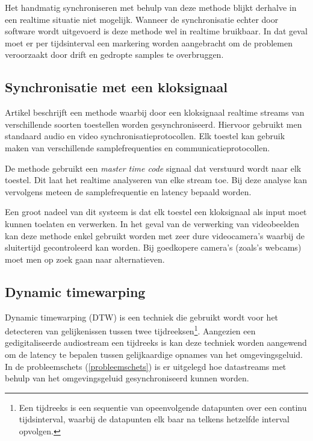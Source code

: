 Het handmatig synchroniseren met behulp van deze methode blijkt derhalve in een realtime situatie niet mogelijk.  Wanneer de synchronisatie echter door software wordt uitgevoerd is deze methode wel in realtime bruikbaar. In dat geval moet er per tijdsinterval een markering worden aangebracht om de problemen veroorzaakt door drift en gedropte samples te overbruggen.

\subsection{Synchronisatie met een kloksignaal}

Artikel \cite{jaimovich2010synchronization} beschrijft een methode waarbij door een kloksignaal realtime streams van verschillende soorten toestellen worden gesynchroniseerd. Hiervoor gebruikt men standaard audio en video synchronisatieprotocollen. Elk toestel kan gebruik maken van verschillende samplefrequenties en communicatieprotocollen.

De methode gebruikt een \textit{master time code} signaal dat verstuurd wordt naar elk toestel. Dit laat het realtime analyseren van elke stream toe. Bij deze analyse kan vervolgens meteen de samplefrequentie en latency bepaald worden. 

Een groot nadeel van dit systeem is dat elk toestel een kloksignaal als input moet kunnen toelaten en verwerken. In het geval van de verwerking van videobeelden kan deze methode enkel gebruikt worden met zeer dure videocamera's waarbij de sluitertijd gecontroleerd kan worden. Bij goedkopere camera's (zoals's webcams) moet men op zoek gaan naar alternatieven. \cite{six2015multimodal}



\subsection{Dynamic timewarping}

Dynamic timewarping (DTW) is een techniek die gebruikt wordt voor het detecteren van gelijkenissen tussen twee tijdreeksen\footnote{Een tijdreeks is een sequentie van opeenvolgende datapunten over een continu tijdsinterval, waarbij de datapunten elk baar na telkens hetzelfde interval opvolgen.}. Aangezien een gedigitaliseerde audiostream een tijdreeks is kan deze techniek worden aangewend om de latency te bepalen tussen gelijkaardige opnames van het omgevingsgeluid. In de probleemschets (\ref{probleemschets}) is er uitgelegd hoe datastreams met behulp van het omgevingsgeluid gesynchroniseerd kunnen worden.

